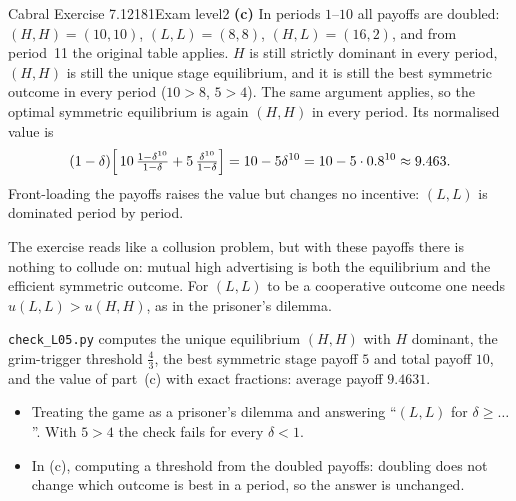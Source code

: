 \begin{exsol}{Cabral Exercise 7.12}{181}{Exam level}{2}
\textbf{(c)} In periods $1$--$10$ all payoffs are doubled: $(H,H) = (10,10)$, $(L,L) = (8,8)$,
$(H,L) = (16,2)$, and from period~11 the original table applies. $H$ is still strictly dominant in every
period, $(H,H)$ is still the unique stage equilibrium, and it is still the best symmetric outcome in every
period ($10 > 8$, $5 > 4$). The same argument applies, so the optimal symmetric equilibrium is again $(H,H)$
in every period. Its normalised value is
\[
  (1-\delta)\Bigl[\,10\,\tfrac{1-\delta^{10}}{1-\delta} + 5\,\tfrac{\delta^{10}}{1-\delta}\Bigr]
  = 10 - 5\delta^{10} = 10 - 5\cdot0.8^{10} \approx 9.463 .
\]
Front-loading the payoffs raises the value but changes no incentive: $(L,L)$ is dominated period by period.

\interp The exercise reads like a collusion problem, but with these payoffs there is nothing to collude
on: mutual high advertising is both the equilibrium and the efficient symmetric outcome. For $(L,L)$ to be
a cooperative outcome one needs $u(L,L) > u(H,H)$, as in the prisoner's dilemma.

\verify \texttt{check\_L05.py} computes the unique equilibrium $(H,H)$ with $H$ dominant, the grim-trigger
threshold $\frac43$, the best symmetric stage payoff $5$ and total payoff $10$, and the value of part~(c)
with exact fractions: average payoff $9.4631$.

\mistakes
\begin{itemize}
  \item Treating the game as a prisoner's dilemma and answering ``$(L,L)$ for $\delta \ge \dots$''. With
  $5 > 4$ the check fails for every $\delta < 1$.
  \item In (c), computing a threshold from the doubled payoffs: doubling does not change which outcome is
  best in a period, so the answer is unchanged.
\end{itemize}

\end{exsol}

